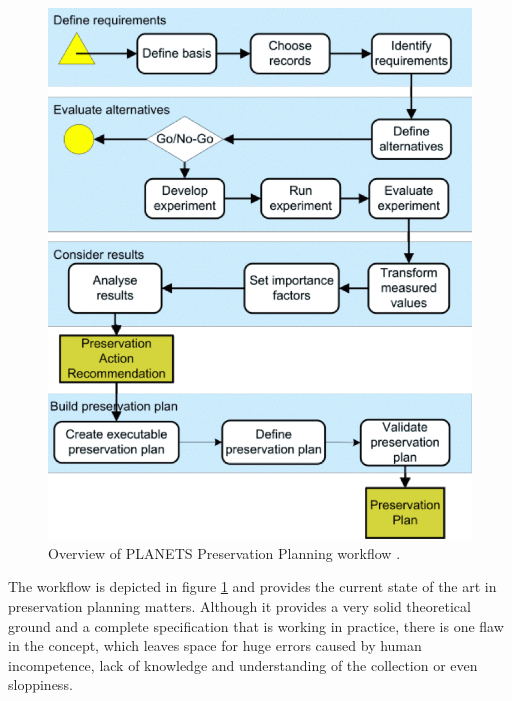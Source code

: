 \begin{figure}[tbp]
\begin{center}
\includegraphics[width=5in]{figures/contentprofiling/planningworkflow.png}
\caption{Overview of PLANETS Preservation Planning workflow \cite{Becker:2008:PSO:1378889.1378954}.}
\label{fig:planningworkflow}
\end{center}
\end{figure}

The workflow is depicted in figure \ref{fig:planningworkflow} and provides the current state of the art in preservation planning matters. Although it provides a very solid theoretical ground and a complete specification that is working in practice, there is one flaw in the concept, which leaves space for huge errors caused by human incompetence, lack of knowledge and understanding of the collection or even sloppiness.

